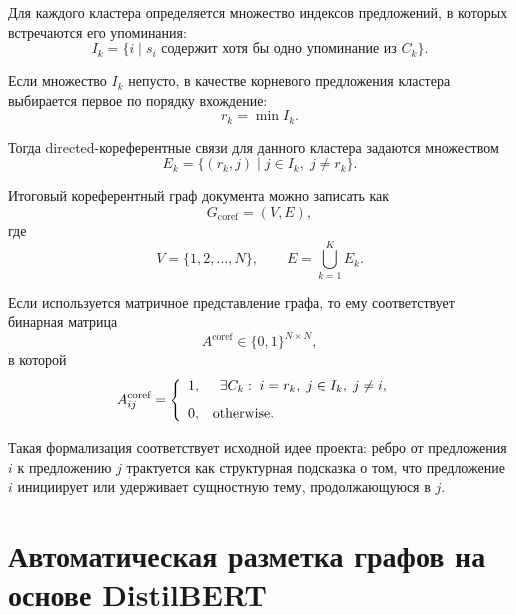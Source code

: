 \documentclass[12pt,a4paper]{article}
\begin{document}
Для каждого кластера определяется множество индексов предложений, в которых встречаются
его упоминания:
\[
I_k = \{ i \mid s_i \text{ содержит хотя бы одно упоминание из } C_k \}.
\]

Если множество $I_k$ непусто, в качестве корневого предложения кластера выбирается первое
по порядку вхождение:
\[
r_k = \min I_k.
\]

Тогда directed-кореферентные связи для данного кластера задаются множеством
\[
E_k = \{(r_k, j) \mid j \in I_k,\; j \neq r_k\}.
\]

Итоговый кореферентный граф документа можно записать как
\[
G_{\text{coref}} = (V, E),
\]
где
\[
V = \{1,2,\dots,N\}, \qquad E = \bigcup_{k=1}^{K} E_k.
\]

Если используется матричное представление графа, то ему соответствует бинарная матрица
\[
A^{\text{coref}} \in \{0,1\}^{N \times N},
\]
в которой
\[
A^{\text{coref}}_{ij} =
\left\{
\begin{array}{ll}
1, &
\begin{array}[t]{l}
\exists C_k: \; i = r_k, \;  j \in I_k,\; j \neq i,
\end{array}
\\[8pt]
0, & \text{otherwise.}
\end{array}
\right.
\]



Такая формализация соответствует исходной идее проекта: ребро от предложения $i$ к
предложению $j$ трактуется как структурная подсказка о том, что предложение $i$
инициирует или удерживает сущностную тему, продолжающуюся в $j$.

\section{Автоматическая разметка графов на основе DistilBERT}
\end{document}
